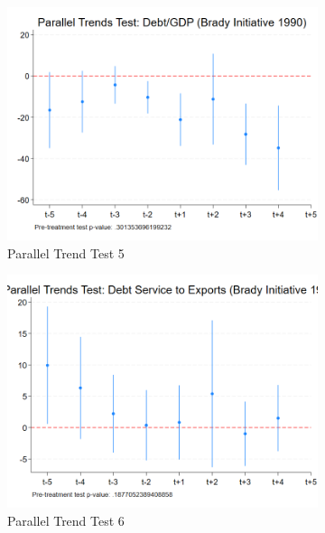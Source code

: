 \begin{figure}[ht!]
\begin{subfigure}[b]{0.48\textwidth}
        \centering
        \includegraphics[width=\textwidth]{figures/PT_Brady_Debt.png}
        \caption{Parallel Trend Test 5}
        \label{fig:pt5_eme}
    \end{subfigure}
    \hfill
    \begin{subfigure}[b]{0.48\textwidth}
        \centering
        \includegraphics[width=\textwidth]{figures/PT_Brady_DebtServ.png}
        \caption{Parallel Trend Test 6}
        \label{fig:pt6_eme}
    \end{subfigure}
    \\[1em]
    \begin{subfigure}[b]{0.48\textwidth}
        \centering

\end{subfigure}
\end{figure}
